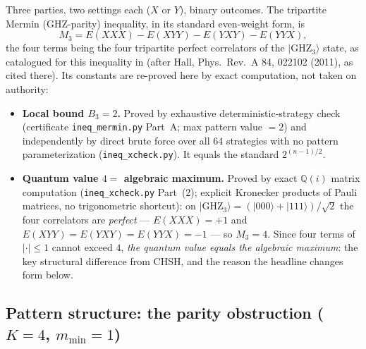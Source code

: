 \documentclass[aps,pra,reprint,superscriptaddress,floatfix]{revtex4-2}
\newcommand{\ket}[1]{\lvert #1\rangle}
\begin{document}
Three parties, two settings each ($X$ or $Y$), binary outcomes. The
tripartite {Mermin} (GHZ-parity) inequality, in its standard even-weight
form, is
\begin{equation}
M_{3}=E(XXX)-E(XYY)-E(YXY)-E(YYX),
\label{eq:m3}
\end{equation}
the four terms being the four tripartite perfect correlators of the
$\ket{\mathrm{GHZ}_{3}}$ state, as catalogued for this inequality in
\cite{alai2026b} (after Hall, Phys.\ Rev.\ A 84, 022102 (2011), as cited
there). Its constants are re-proved here by exact computation, not taken
on authority:

\begin{itemize}
\item \textbf{Local bound $B_{3}=2$.} Proved by exhaustive
  deterministic-strategy check (certificate \texttt{ineq\_mermin.py}
  Part~A; max pattern value $=2$) and independently by direct brute force
  over all $64$ strategies with no pattern parameterization
  (\texttt{ineq\_xcheck.py}). It equals the standard $2^{(n-1)/2}$.
\item \textbf{Quantum value $4=$ algebraic maximum.} Proved by exact
  $\mathbb{Q}(i)$ matrix computation (\texttt{ineq\_xcheck.py} Part~(2);
  explicit Kronecker products of Pauli matrices, no trigonometric
  shortcut): on $\ket{\mathrm{GHZ}_{3}}=(\ket{000}+\ket{111})/\sqrt{2}$
  the four correlators are \emph{perfect} --- $E(XXX)=+1$ and
  $E(XYY)=E(YXY)=E(YYX)=-1$ --- so $M_{3}=4$. Since four terms of
  $|\cdot|\le 1$ cannot exceed $4$, \emph{the quantum value equals the
  algebraic maximum}: the key structural difference from {CHSH}, and the
  reason the headline changes form below.
\end{itemize}

\subsection{Pattern structure: the parity obstruction ($K=4$,
$m_{\min}=1$)}
\end{document}
